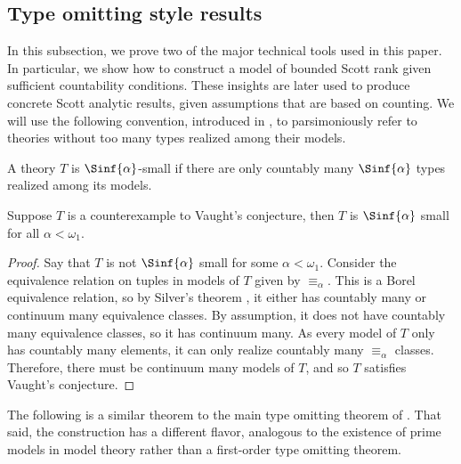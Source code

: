 \documentclass{amsart}
\renewcommand{\-}{\text{-}}
\begin{document}
\subsection{Type omitting style results}
In this subsection, we prove two of the major technical tools used in this paper.
In particular, we show how to construct a model of bounded Scott rank given sufficient countability conditions. 
These insights are later used to produce concrete Scott analytic results, given assumptions that are based on counting.
We will use the following convention, introduced in \cite{MonICM}, to parsimoniously refer to theories without too many types realized among their models.

\begin{definition}\label{def:small}
  A theory $T$ is $\Sinf{\alpha}$-small if there are only countably many $\Sinf{\alpha}$ types realized among its models. 
\end{definition}

\begin{proposition}\label{prop:smallvaughts}
  Suppose $T$ is a counterexample to Vaught's conjecture, then $T$ is $\Sinf{\alpha}$ small for all $\alpha<\omega_1$.
\end{proposition}

\begin{proof}
Say that $T$ is not $\Sinf{\alpha}$ small for some $\alpha<\omega_1$.
Consider the equivalence relation on tuples in models of $T$ given by $\equiv_\alpha$.
This is a Borel equivalence relation, so by Silver's theorem \cite{Sil80}, it either has countably many or continuum many equivalence classes.
By assumption, it does not have countably many equivalence classes, so it has continuum many.
As every model of $T$ only has countably many elements, it can only realize countably many $\equiv_\alpha$ classes.
Therefore, there must be continuum many models of $T$, and so $T$ satisfies Vaught's conjecture.
\end{proof}

The following is a similar theorem to the main type omitting theorem of \cite{MonSR}.
That said, the construction has a different flavor, analogous to the existence of prime models in model theory rather than a first-order type omitting theorem.
\end{document}
